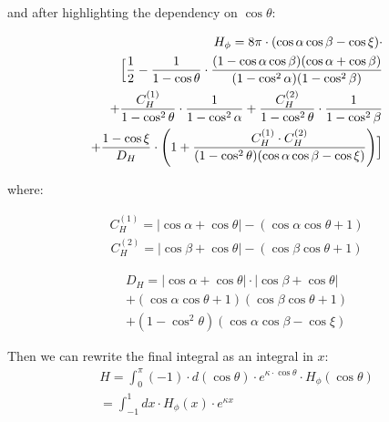 and after highlighting the dependency on $\cos\theta$:

\begin{equation}\begin{aligned}
H_{\phi} = 8 \pi \cdot (\cos\alpha \cos\beta - \cos\xi) \cdot \\ \Bigl[
\frac{1}{2} - \frac{1}{1 - \cos\theta} \cdot \frac{(1 - \cos\alpha \cos\beta)(\cos\alpha +\cos\beta)}{(1-\cos^2\alpha)(1-\cos^2\beta)} \\ + \frac{C_H^{(1)}}{1-\cos^2\theta} \cdot \frac{1}{1-\cos^2\alpha} + \frac{C_H^{(2)}}{1-\cos^2\theta} \cdot \frac{1}{1-\cos^2\beta} \\ + \frac{1 - \cos\xi}{D_H} \cdot \left(1 + \frac{C_H^{(1)}\cdot C_H^{(2)}}{(1-\cos^2\theta)(\cos\alpha \cos\beta -  \cos\xi)}\right)
\Bigr]
\end{aligned}\end{equation}

where:

\begin{equation}\begin{aligned}
C_H^{(1)} = |\cos\alpha + \cos\theta| - (\cos\alpha \cos\theta + 1)
\end{aligned}\end{equation}
\begin{equation}\begin{aligned}
C_H^{(2)} = |\cos\beta + \cos\theta| - (\cos\beta \cos\theta + 1)
\end{aligned}\end{equation}

\begin{equation}\begin{aligned}
D_H = |\cos\alpha+\cos\theta|\cdot |\cos\beta+ \cos\theta| \\ + (\cos\alpha \cos\theta+1)(\cos\beta \cos\theta +1) \\+ (1-\cos^2\theta)(\cos\alpha \cos\beta - \cos\xi)
\end{aligned}\end{equation}

Then we can rewrite the final integral as an integral in $x$:
\begin{equation}\begin{aligned}
H = \int_{0}^{\pi} (-1) \cdot d(\cos \theta) \cdot e^{\kappa \cdot \cos \theta} \cdot H_{\phi}(\cos \theta) \\ = \int_{-1}^{1} dx \cdot H_{\phi}(x) \cdot e^{\kappa x}
\end{aligned}\end{equation}


